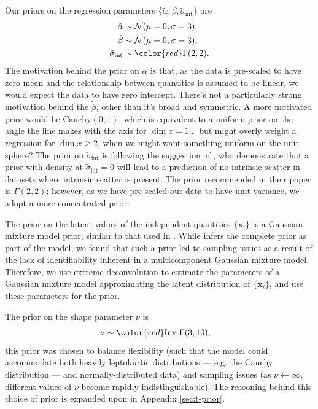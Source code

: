 \documentclass[fleqn,usenatbib]{mnras}
\newcommand{\indepvars}{\boldsymbol{x}_i}
\newcommand{\intercept}{\alpha}
\newcommand{\covariate}{\beta}
\begin{document}
Our priors on the regression parameters $\{\tilde{\intercept},
\tilde{\covariate}, \tilde{\sigma}_{\text{int}}\}$ are
\begin{align}
    \tilde{\intercept} \sim&\; \mathcal N(\mu = 0, \sigma = 3), \\
    \tilde{\covariate} \sim&\; \mathcal N(\mu = 0, \sigma = 3), \\
    \tilde{\sigma}_{\text{int}} \sim&\; {\color{red}\Gamma(2, 2)}.
\end{align}
The motivation behind the prior on $\tilde{\intercept}$ is that, as the data is
pre-scaled to have zero mean and the relationship between quantities is assumed
to be linear, we would expect the data to have zero intercept.  {\color{red}
There's not a particularly strong motivation behind the $\tilde{\covariate}$,
other than it's broad and symmetric. A more motivated prior would be
$\text{Cauchy}(0, 1)$, which is equivalent to a uniform prior on the angle the
line makes with the axis for $\dim x = 1$... but might overly weight a
regression for $\dim x \geq 2$, when we might want something uniform on the unit
sphere?} The prior on $\tilde{\sigma}_{\text{int}}$ is following the suggestion
of \citet{Chung:2015}, who demonstrate that a prior with density at
$\tilde{\sigma}_{\text{int}} = 0$ will lead to a prediction of no intrinsic
scatter in datasets where intrinsic scatter is present. The prior recommended in
their paper is {\color{red} $\Gamma(2, 2)$}; however, as we have pre-scaled our
data to have unit variance, we adopt a more concentrated prior.

The prior on the latent values of the independent quantities $\{\indepvars\}$ is
a Gaussian mixture model prior, similar to that used in \citet{Kelly:2007}.
While \citeauthor{Kelly:2007} infers the complete prior as part of the model, we
found that such a prior led to sampling issues as a result of the lack of
identifiability inherent in a multicomponent Gaussian mixture model. Therefore,
we use extreme deconvolution \citep{Bovy:2011} to estimate the parameters of a
Gaussian mixture model approximating the latent distribution of
$\{\indepvars\}$, and use these parameters for the prior.

The prior on the shape parameter $\nu$ is
\begin{align}
    \nu \sim&\; {\color{red}\text{Inv-}\Gamma(3, 10)};
\end{align}
this prior was chosen to balance flexibility (such that the model could
accommodate both heavily leptokurtic distributions --- e.g. the Cauchy
distribution --- and normally-distributed data) and sampling issues (as $\nu
\leftarrow \infty$, different values of $\nu$ become rapidly indistinguishable).
The reasoning behind this choice of prior is expanded upon in Appendix
\ref{sec:t-prior}.
\end{document}
